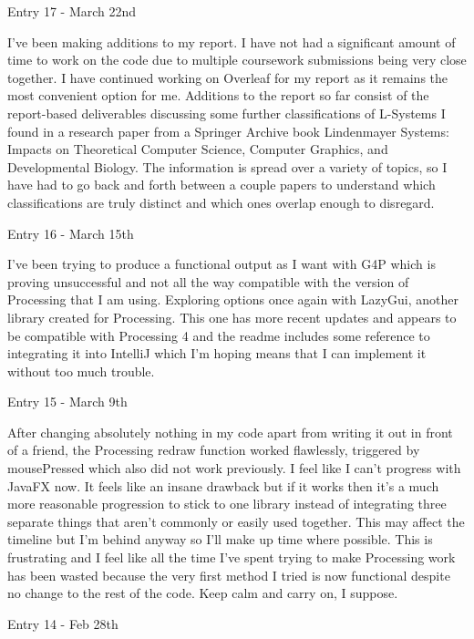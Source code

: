 \documentclass[]{final_report}
\begin{document}
Entry 17 - March 22nd

I've been making additions to my report. I have not had a significant amount of time to work on the code due to multiple coursework submissions being very close together. I have continued working on Overleaf for my report as it remains the most convenient option for me. Additions to the report so far consist of the report-based deliverables discussing some further classifications of L-Systems I found in a research paper from a Springer Archive book Lindenmayer Systems: Impacts on Theoretical Computer Science, Computer Graphics, and Developmental Biology. The information is spread over a variety of topics, so I have had to go back and forth between a couple papers to understand which classifications are truly distinct and which ones overlap enough to disregard.

Entry 16 - March 15th

I've been trying to produce a functional output as I want with G4P which is proving unsuccessful and not all the way compatible with the version of Processing that I am using. Exploring options once again with LazyGui, another library created for Processing. This one has more recent updates and appears to be compatible with Processing 4 and the readme includes some reference to integrating it into IntelliJ which I'm hoping means that I can implement it without too much trouble.

Entry 15 - March 9th

After changing absolutely nothing in my code apart from writing it out in front of a friend, the Processing redraw function worked flawlessly, triggered by mousePressed which also did not work previously. I feel like I can't progress with JavaFX now. It feels like an insane drawback but if it works then it's a much more reasonable progression to stick to one library instead of integrating three separate things that aren't commonly or easily used together. This may affect the timeline but I'm behind anyway so I'll make up time where possible.
This is frustrating and I feel like all the time I've spent trying to make Processing work has been wasted because the very first method I tried is now functional despite no change to the rest of the code. Keep calm and carry on, I suppose.

Entry 14 - Feb 28th
\end{document}
